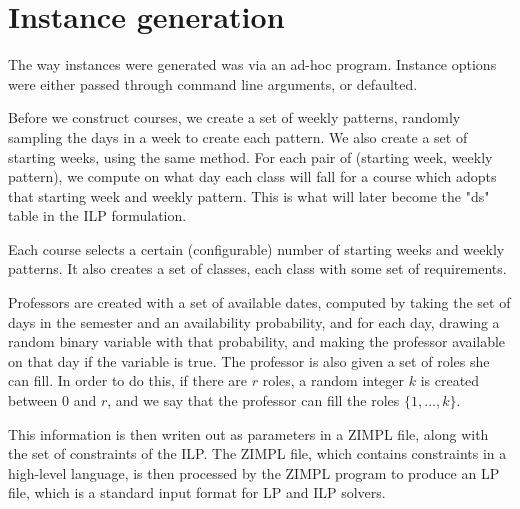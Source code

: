 \section{Instance generation}
\label{app:generate}

The way instances were generated was via an ad-hoc program. Instance options were either passed through command line arguments, or defaulted.

Before we construct courses, we create a set of weekly patterns, randomly sampling the days in a week to create each pattern. We also create a set of starting weeks, using the same method. For each pair of (starting week, weekly pattern), we compute on what day each class will fall for a course which adopts that starting week and weekly pattern. This is what will later become the "ds" table in the ILP formulation.

Each course selects a certain (configurable) number of starting weeks and weekly patterns. It also creates a set of classes, each class with some set of requirements.

Professors are created with a set of available dates, computed by taking the set of days in the semester and an availability probability, and for each day, drawing a random binary variable with that probability, and making the professor available on that day if the variable is true. The professor is also given a set of roles she can fill. In order to do this, if there are $r$ roles, a random integer $k$ is created between 0 and $r$, and we say that the professor can fill the roles $\{1, \dots, k\}$.

This information is then writen out as parameters in a ZIMPL\cite{Koch2004} file, along with the set of constraints of the ILP. The ZIMPL file, which contains constraints in a high-level language, is then processed by the ZIMPL program to produce an LP file, which is a standard input format for LP and ILP solvers.
